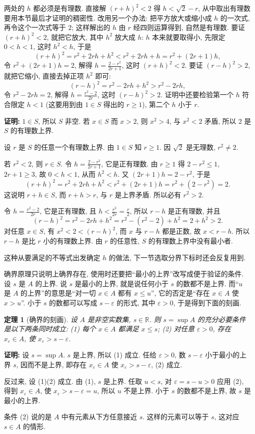\documentclass[UTF8,openany]{ctexbook}
\theoremstyle{chinesetextbook}
\newtheorem{theorem}{定理}[section]
\newenvironment{cnproof}{\par\indent\textbf{证明:} \ignorespaces}{\par}
\begin{document}
两处的 $h$ 都必须是有理数. 直接解 $(r+h)^2<2$ 得 $h<\sqrt2-r$, 从中取出有理数要用本节最后才证明的稠密性. 改用另一个办法: 把平方放大或缩小成 $h$ 的一次式, 再令这个一次式等于 $2$; 这样解出的 $h$ 由 $r$ 经四则运算得到, 自然是有理数. 要证 $(r+h)^2<2$, 就把它放大, 其中 $h^2$ 放大成 $h$: $h$ 本来就要取得小, 先限定 $0<h<1$, 这时 $h^2<h$, 于是
\[
(r+h)^2=r^2+2rh+h^2<r^2+2rh+h=r^2+(2r+1)h,
\]
令 $r^2+(2r+1)h=2$, 解得 $\displaystyle h=\frac{2-r^2}{2r+1}$, 这时 $(r+h)^2<2$. 要证 $(r-h)^2>2$, 就把它缩小, 直接去掉正项 $h^2$ 即可:
\[
(r-h)^2=r^2-2rh+h^2>r^2-2rh,
\]
令 $r^2-2rh=2$, 解得 $\displaystyle h=\frac{r^2-2}{2r}$, 这时 $(r-h)^2>2$. 证明中还要检验第一个 $h$ 符合限定 $h<1$ (这要用到由 $1\in S$ 得出的 $r\ge1$), 第二个 $h$ 小于 $r$.
\begin{cnproof}
$1\in S$, 所以 $S$ 非空. 若 $x\in S$ 而 $x>2$, 则 $x^2>4$, 与 $x^2<2$ 矛盾, 所以 $2$ 是 $S$ 的有理数上界.

设 $r$ 是 $S$ 的任意一个有理数上界. 由 $1\in S$ 知 $r\ge1$. 因 $\sqrt2$ 是无理数, $r^2\ne2$.

若 $r^2<2$, 则 $r\in S$. 令 $\displaystyle h=\frac{2-r^2}{2r+1}$, 它是正有理数. 由 $r\ge1$ 得 $2-r^2\le1$, $2r+1\ge3$, 故 $0<h<1$, 从而 $h^2<h$. 又 $(2r+1)h=2-r^2$, 于是
\[
(r+h)^2=r^2+2rh+h^2<r^2+(2r+1)h=r^2+(2-r^2)=2.
\]
这说明 $r+h\in S$, 而 $r+h>r$, 与 $r$ 是上界矛盾. 所以必有 $r^2>2$.

令 $\displaystyle h=\frac{r^2-2}{2r}$, 它是正有理数, 且 $\displaystyle h<\frac{r^2}{2r}=\frac r2$, 所以 $r-h$ 是正有理数, 并且
\[
(r-h)^2=r^2-2rh+h^2=r^2-(r^2-2)+h^2=2+h^2>2.
\]
对任意 $x\in S$, 有 $x^2<2<(r-h)^2$, 而 $x$ 与 $r-h$ 都是正数, 故 $x<r-h$. 所以 $r-h$ 是比 $r$ 小的有理数上界. 由 $r$ 的任意性, $S$ 的有理数上界中没有最小者.
\end{cnproof}
这种从要满足的不等式出发确定 $h$ 的做法, 下一节选取分界下标时还会反复用到.

确界原理只说明上确界存在, 使用时还要把“最小的上界”改写成便于验证的条件. 设 $s$ 是 $A$ 的上界. 说 $s$ 是最小的上界, 就是说任何小于 $s$ 的数都不是上界. 而“$u$ 是 $A$ 的上界”的意思是“对一切 $x\in A$ 都有 $x\le u$”, 它的否定是“存在 $x\in A$ 使 $x>u$”. 小于 $s$ 的数都可以写成 $s-\varepsilon$ 的形式, 其中 $\varepsilon>0$, 于是得到下面的刻画.
\begin{theorem}[确界的刻画]
设 $A$ 是非空实数集, $s\in\mathbb R$. 则 $s=\sup A$ 的充分必要条件是以下两条同时成立: \textup{(1)} 每个 $x\in A$ 都满足 $x\le s$; \textup{(2)} 对任意 $\varepsilon>0$, 存在 $x_\varepsilon\in A$, 使 $x_\varepsilon>s-\varepsilon$.
\end{theorem}
\begin{cnproof}
设 $s=\sup A$. $s$ 是上界, 所以 (1) 成立. 任给 $\varepsilon>0$, 数 $s-\varepsilon$ 小于最小的上界 $s$, 因而不是上界, 即存在 $x_\varepsilon\in A$ 使 $x_\varepsilon>s-\varepsilon$, (2) 成立.

反过来, 设 (1)(2) 成立. 由 (1), $s$ 是上界. 任取 $u<s$, 对 $\varepsilon=s-u>0$ 应用 (2), 得到 $x_\varepsilon\in A$, 使 $x_\varepsilon>s-\varepsilon=u$, 所以 $u$ 不是上界. 小于 $s$ 的数都不是上界, 故 $s$ 是最小的上界.
\end{cnproof}
条件 (2) 说的是 $A$ 中有元素从下方任意接近 $s$. 这样的元素可以等于 $s$, 这对应 $s\in A$ 的情形.
\end{document}
